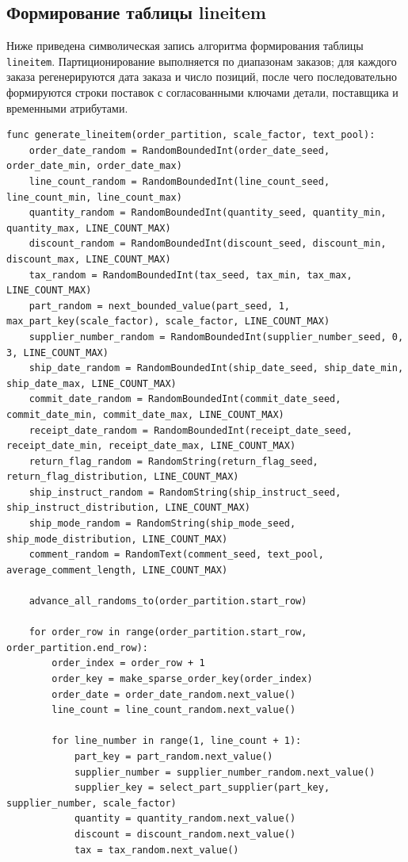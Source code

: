 \subsection{Формирование таблицы lineitem}

Ниже приведена символическая запись алгоритма формирования таблицы
\texttt{lineitem}. Партиционирование выполняется по диапазонам заказов; для
каждого заказа регенерируются дата заказа и число позиций, после чего
последовательно формируются строки поставок с согласованными ключами детали,
поставщика и временными атрибутами.

\begin{lstlisting}[caption={Формирование таблицы lineitem}]
func generate_lineitem(order_partition, scale_factor, text_pool):
    order_date_random = RandomBoundedInt(order_date_seed, order_date_min, order_date_max)
    line_count_random = RandomBoundedInt(line_count_seed, line_count_min, line_count_max)
    quantity_random = RandomBoundedInt(quantity_seed, quantity_min, quantity_max, LINE_COUNT_MAX)
    discount_random = RandomBoundedInt(discount_seed, discount_min, discount_max, LINE_COUNT_MAX)
    tax_random = RandomBoundedInt(tax_seed, tax_min, tax_max, LINE_COUNT_MAX)
    part_random = next_bounded_value(part_seed, 1, max_part_key(scale_factor), scale_factor, LINE_COUNT_MAX)
    supplier_number_random = RandomBoundedInt(supplier_number_seed, 0, 3, LINE_COUNT_MAX)
    ship_date_random = RandomBoundedInt(ship_date_seed, ship_date_min, ship_date_max, LINE_COUNT_MAX)
    commit_date_random = RandomBoundedInt(commit_date_seed, commit_date_min, commit_date_max, LINE_COUNT_MAX)
    receipt_date_random = RandomBoundedInt(receipt_date_seed, receipt_date_min, receipt_date_max, LINE_COUNT_MAX)
    return_flag_random = RandomString(return_flag_seed, return_flag_distribution, LINE_COUNT_MAX)
    ship_instruct_random = RandomString(ship_instruct_seed, ship_instruct_distribution, LINE_COUNT_MAX)
    ship_mode_random = RandomString(ship_mode_seed, ship_mode_distribution, LINE_COUNT_MAX)
    comment_random = RandomText(comment_seed, text_pool, average_comment_length, LINE_COUNT_MAX)

    advance_all_randoms_to(order_partition.start_row)

    for order_row in range(order_partition.start_row, order_partition.end_row):
        order_index = order_row + 1
        order_key = make_sparse_order_key(order_index)
        order_date = order_date_random.next_value()
        line_count = line_count_random.next_value()

        for line_number in range(1, line_count + 1):
            part_key = part_random.next_value()
            supplier_number = supplier_number_random.next_value()
            supplier_key = select_part_supplier(part_key, supplier_number, scale_factor)
            quantity = quantity_random.next_value()
            discount = discount_random.next_value()
            tax = tax_random.next_value()


\end{lstlisting}
